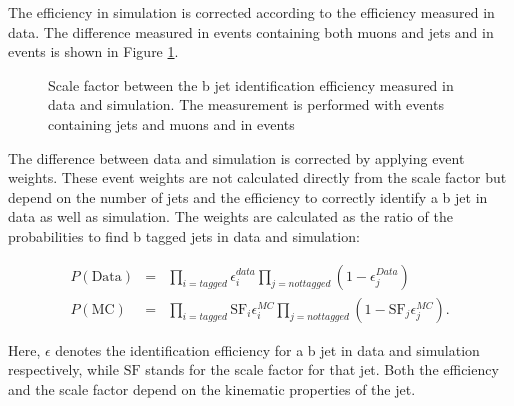The efficiency in simulation is corrected according to the efficiency measured in data. The difference measured in events containing both muons and jets and in \ttbar events is shown in Figure \ref{fig:reco_btagsf}.

\begin{figure}[htbp!]
  \begin{center}
\caption{Scale factor between the b jet identification efficiency measured in data and simulation. The measurement is performed with events containing jets and muons and in \ttbar events \cite{CMS-DP-2017-012}
  \label{fig:reco_btagsf}}
  \end{center}
\end{figure}

The difference between data and simulation is corrected by applying event weights. These event weights are not calculated directly from the scale factor but depend on the number of jets and the
efficiency to correctly identify a b jet in data as well as simulation.
The weights are calculated as the ratio of the probabilities to find b tagged jets in data and simulation:

\begin{eqnarray}
P(\mathrm{Data}) & = &\prod_{i=tagged} \epsilon_i^{data} \prod_{j=not tagged} (1-\epsilon_j^{Data}) \\
P(\mathrm{MC})& = &\prod_{i=tagged} \mathrm{SF}_i\epsilon_i^{MC} \prod_{j=not tagged} (1-\mathrm{SF}_j\epsilon_j^{MC}).
\end{eqnarray}

Here, $\epsilon$ denotes the identification efficiency for a b jet in data and simulation respectively, while $\mathrm{SF}$ stands for the scale factor for that jet.
Both the efficiency and the scale factor depend on the kinematic properties of the jet.

